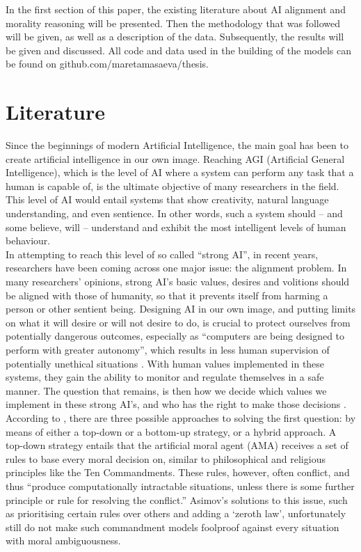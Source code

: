 \documentclass[final]{clv3} %
\begin{document}
In the first section of this paper, the existing literature about AI alignment and morality reasoning will be presented. Then the methodology that was followed will be given, as well as a description of the data. Subsequently, the results will be given and discussed. All code and data used in the building of the models can be found on github.com/maretamasaeva/thesis.

\section{Literature}

Since the beginnings of modern Artificial Intelligence, the main goal has been to create artificial intelligence in our own image.  Reaching AGI (Artificial General Intelligence), which is the level of AI where a system can perform any task that a human is capable of, is the ultimate objective of many researchers in the field. This level of AI would entail systems that show creativity, natural language understanding, and even sentience. In other words, such a system should – and some believe, will – understand and exhibit the most intelligent levels of human behaviour. \\

In attempting to reach this level of so called “strong AI”, in recent years, researchers have been coming across one major issue: the alignment problem. In many researchers’ opinions, strong AI’s basic values, desires and volitions should be aligned with those of humanity, so that it prevents itself from harming a person or other sentient being. Designing AI in our own image, and putting limits on what it will desire or will not desire to do, is crucial to protect ourselves from potentially dangerous outcomes, especially as “computers are being designed to perform with greater autonomy”, which results in less human supervision of potentially unethical situations \cite{allen2005}. With human values implemented in these systems, they gain the ability to monitor and regulate themselves in a safe manner. The question that remains, is then how we decide which values we implement in these strong AI’s, and who has the right to make those decisions \cite{gabriel}. According to \citet{allen2005}, there are three possible approaches to solving the first question: by means of either a top-down or a bottom-up strategy, or a hybrid approach. A top-down strategy entails that the artificial moral agent (AMA) receives a set of rules to base every moral decision on, similar to philosophical and religious principles like the Ten Commandments. These rules, however, often conflict, and thus “produce computationally intractable situations, unless there is some further principle or rule for resolving the conflict.” Asimov’s solutions to this issue, such as prioritising certain rules over others and adding a ‘zeroth law’, unfortunately still do not make such commandment models foolproof against every situation with moral ambiguousness. \\
\end{document}
